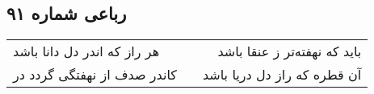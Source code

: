 \begin{center}
\section*{رباعی شماره ۹۱}
\label{sec:sh091}
\begin{longtable}{l p{0.5cm} r}
هر راز که اندر دل دانا باشد
&&
باید که نهفته‌تر ز عنقا باشد
\\
کاندر صدف از نهفتگی گردد در
&&
آن قطره که راز دل دریا باشد
\\
\end{longtable}
\end{center}
